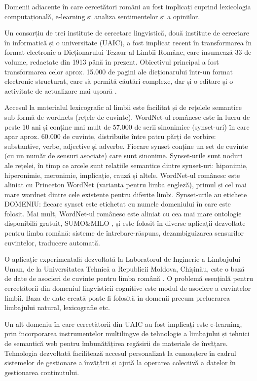 \begin{multicols}{2}
Domenii adiacente în care cercetători români au fost implicați cuprind lexicologia computațională, \mbox{e-learning} și analiza sentimentelor și a opiniilor. 

Un consorțiu de trei institute de cercetare lingvistică, două institute de cercetare în informatică și o universitate (UAIC), a fost implicat recent în transformarea în format electronic a Dicționarului Tezaur al Limbii Române, care însumează 33 de volume, redactate din 1913 până în prezent. Obiectivul principal a fost transformarea celor aprox. 15.000 de pagini ale dicționarului \mbox{într-un} format electronic structurat, care să permită căutări complexe, dar și o editare și o activitate de actualizare mai ușoară \cite{cristea3}.

Accesul la materialul lexicografic al limbii este facilitat și de rețelele semantice sub formă de wordnets (rețele de cuvinte). WordNet-ul românesc este în lucru de peste 10 ani și conține mai mult de 57.000 de serii sinonimice (synset-uri) în care apar aprox. 60.000 de cuvinte, distribuite între patru părți de vorbire: substantive, verbe, adjective și adverbe. Fiecare synset conține un set de cuvinte (cu un număr de sensuri asociate) care sunt sinonime. Synset-urile sunt noduri ale rețelei, în timp ce arcele sunt relațiile semantice dintre synset-uri: hiponimie, hiperonimie, meronimie, implicație, cauză și altele. WordNet-ul românesc este aliniat cu Princeton WordNet \cite{wnURL} (varianta pentru limba engleză), primul și cel mai mare wordnet dintre cele existente pentru diferite limbi. Synset-urile au etichete DOMENIU: fiecare synset este etichetat cu numele domeniului în care este folosit. Mai mult, WordNet-ul românesc este aliniat cu cea mai mare ontologie disponibilă gratuit, SUMO\&MILO \cite{ro_wnURL}, și este folosit în diverse aplicații dezvoltate pentru limba română: sisteme de întrebare-răspuns, dezambiguizarea sensurilor cuvintelor, traducere automată.

O aplicație experimentală dezvoltată la Laboratorul de Inginerie a Limbajului Uman, de la Universitatea Tehnică a Republicii Moldova, Chișinău, este o bază de date de asocieri de cuvinte pentru limba română \cite{sem_dict}. O problemă esențială pentru cercetătorii din domeniul lingvisticii cognitive este modul de asociere a cuvintelor limbii. Baza de date creată poate fi folosită în domenii precum prelucrarea limbajului natural, lexicografie etc.

Un alt domeniu în care cercetătorii din UAIC au fost implicați este e-learning, prin încorporarea instrumentelor multilingve de tehnologie a limbajului și tehnici de semantică web pentru îmbunătățirea regăsirii de materiale de învățare. Tehnologia dezvoltată facilitează accesul personalizat la cunoaștere în cadrul sistemelor de gestionare a învățării și ajută la operarea colectivă a datelor în gestionarea conținutului.


\end{multicols}
